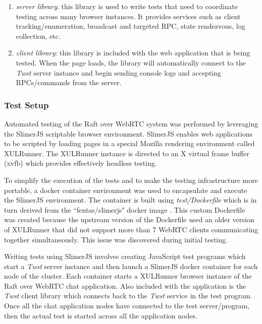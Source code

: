 \documentclass[conference,compsoc]{./IEEEtran/IEEEtran}
\begin{document}
\begin{enumerate}
    \item \emph{server library}: this library is used to write tests
        that need to coordinate testing across many browser instances.
        It provides services such as client tracking/enumeration,
        broadcast and targeted RPC, state rendezvous, log collection,
        etc.
    \item \emph{client library}: this library is included with the web
        application that is being tested. When the page loads, the
        library will automatically connect to the \emph{Twst} server
        instance and begin sending console logs and accepting
        RPCs/commands from the server.
\end{enumerate}


\subsubsection{Test Setup}

Automated testing of the Raft over WebRTC system was performed by
leveraging the SlimerJS scriptable browser environment. SlimerJS
enables web applications to be scripted by loading pages in a special
Mozilla rendering environment called XULRunner. The XULRunner instance
is directed to an X virtual frame buffer (xvfb) which provides
effectively headless testing.

To simplify the execution of the tests and to make the testing
infrastructure more portable, a docker container environment was used
to encapsulate and execute the SlimerJS environment. The container is
built using \emph{test/Dockerfile} which is in turn derived from
the ``fentas/slimerjs" docker image \cite{fentas:slimerjs}.
This custom Dockerfile was created because the upstream version of the
Dockerfile used an older version of XULRunner that did not support
more than 7 WebRTC clients communicating together simultaneously. This
issue was discovered during initial testing.

Writing tests using SlimerJS involves creating JavaScript test programs
which start a \emph{Twst} server instance and then launch a SlimerJS
docker container for each node of the cluster. Each container starts
a XULRunner browser instance of the Raft over WebRTC chat application.
Also included with the application is the \emph{Twst} client library
which connects back to the \emph{Twst} service in the test program.
Once all the chat application nodes have connected to the test
server/program, then the actual test is started across all the
application nodes.
\end{document}
